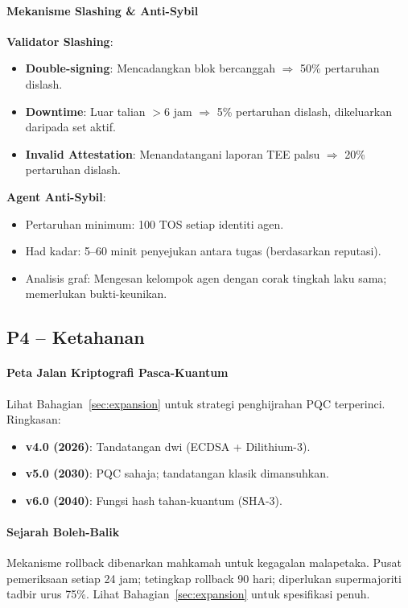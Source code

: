 \documentclass[11pt]{article}
\begin{document}
\paragraph{Mekanisme Slashing \& Anti-Sybil}
\textbf{Validator Slashing}:
\begin{itemize}[noitemsep]
  \item \textbf{Double-signing}: Mencadangkan blok bercanggah $\Rightarrow$ 50\% pertaruhan dislash.
  \item \textbf{Downtime}: Luar talian $>$6 jam $\Rightarrow$ 5\% pertaruhan dislash, dikeluarkan daripada set aktif.
  \item \textbf{Invalid Attestation}: Menandatangani laporan TEE palsu $\Rightarrow$ 20\% pertaruhan dislash.
\end{itemize}

\textbf{Agent Anti-Sybil}:
\begin{itemize}[noitemsep]
  \item Pertaruhan minimum: 100 TOS setiap identiti agen.
  \item Had kadar: 5--60 minit penyejukan antara tugas (berdasarkan reputasi).
  \item Analisis graf: Mengesan kelompok agen dengan corak tingkah laku sama; memerlukan bukti-keunikan.
\end{itemize}

\subsection{P4 -- Ketahanan}
\label{sec:pillar-resilience}

\paragraph{Peta Jalan Kriptografi Pasca-Kuantum}
Lihat Bahagian~\ref{sec:expansion} untuk strategi penghijrahan PQC terperinci. Ringkasan:
\begin{itemize}[noitemsep]
  \item \textbf{v4.0 (2026)}: Tandatangan dwi (ECDSA + Dilithium-3).
  \item \textbf{v5.0 (2030)}: PQC sahaja; tandatangan klasik dimansuhkan.
  \item \textbf{v6.0 (2040)}: Fungsi hash tahan-kuantum (SHA-3).
\end{itemize}

\paragraph{Sejarah Boleh-Balik}
Mekanisme rollback dibenarkan mahkamah untuk kegagalan malapetaka. Pusat pemeriksaan setiap 24 jam; tetingkap rollback 90 hari; diperlukan supermajoriti tadbir urus 75\%. Lihat Bahagian~\ref{sec:expansion} untuk spesifikasi penuh.
\end{document}
